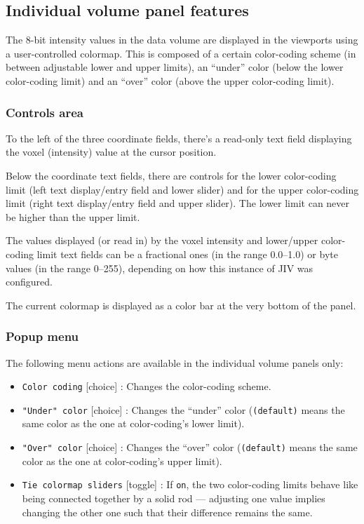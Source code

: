 \subsection{Individual volume panel features}
\label{sec:individual-panel-features}
The 8-bit intensity values in the data volume are displayed in the
viewports using a user-controlled colormap.  This is composed of a
certain color-coding scheme (in between adjustable lower and upper
limits), an ``under'' color (below the lower color-coding limit) and
an ``over'' color (above the upper color-coding limit).

\subsubsection{Controls area}
To the left of the three coordinate fields, there's a read-only text
field displaying the voxel (intensity) value at the cursor position.

Below the coordinate text fields, there are controls for the lower
color-coding limit (left text display/entry field and lower slider)
and for the upper color-coding limit (right text display/entry field
and upper slider).  The lower limit can never be higher than the upper
limit. 

The values displayed (or read in) by the voxel intensity and
lower/upper color-coding limit text fields can be a fractional ones
(in the range 0.0--1.0) or byte values (in the range 0--255),
depending on how this instance of JIV was configured.

The current colormap is displayed as a color bar at the very bottom of
the panel.

\subsubsection{Popup menu}
The following menu actions are available in the individual volume
panels only:
\begin{itemize}
\item \verb+Color coding+ [choice] : Changes the color-coding scheme.
\item \verb+"Under" color+ [choice] : Changes the ``under'' color
  (\verb+(default)+ means the same color as the one at color-coding's
  lower limit).
\item \verb+"Over" color+ [choice] : Changes the ``over'' color
  (\verb+(default)+ means the same color as the one at color-coding's
  upper limit).
\item \verb+Tie colormap sliders+ [toggle] : If \verb+on+, the two
  color-coding limits behave like being connected together by a solid
  rod --- adjusting one value implies changing the other one such that
  their difference remains the same.
\end{itemize}

